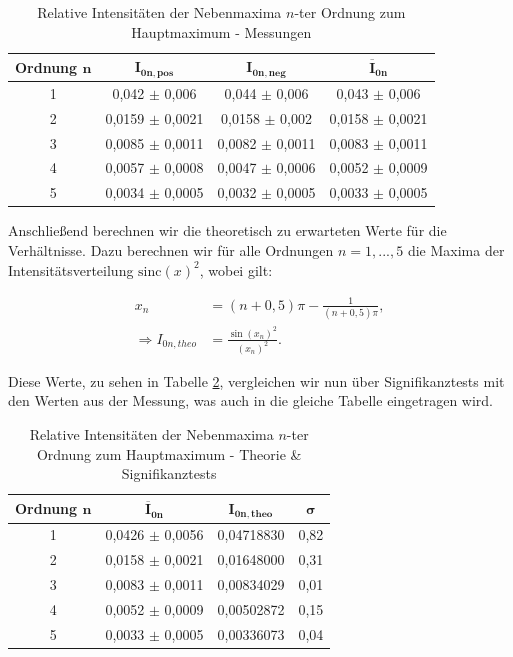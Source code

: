 \documentclass{article}
\begin{document}
\begin{table}[!hb]
    \centering
    \begin{tabular}{cccc}
        \hline
        \textbf{Ordnung} $\bm{n}$ & $\bm{I_{0n,pos}}$ & $\bm{I_{0n,neg}}$ & $\bm{\overline{I}_{0n}}$ \\ \hline
             1 &    0,042 $\pm$ 0,006 &    0,044 $\pm$ 0,006 & 0,043 $\pm$ 0,006 \\
             2 &    0,0159 $\pm$ 0,0021 &    0,0158 $\pm$ 0,002  & 0,0158 $\pm$ 0,0021 \\
             3 &    0,0085 $\pm$ 0,0011 &    0,0082 $\pm$ 0,0011 & 0,0083 $\pm$ 0,0011 \\
             4 &    0,0057 $\pm$ 0,0008 &    0,0047 $\pm$ 0,0006 & 0,0052 $\pm$ 0,0009 \\
             5 &    0,0034 $\pm$ 0,0005 &    0,0032 $\pm$ 0,0005 & 0,0033 $\pm$ 0,0005 \\ \hline
    \end{tabular}%
    \caption{Relative Intensitäten der Nebenmaxima $n$-ter Ordnung zum Hauptmaximum - Messungen}
    \label{tab:Einzelsp_RelInten_Mess}
\end{table}

Anschließend berechnen wir die theoretisch zu erwarteten Werte für die Verhältnisse. Dazu berechnen wir für alle Ordnungen $n = 1, ... , 5$ die Maxima der Intensitätsverteilung $\text{sinc}(x)^2$, wobei gilt:

\begin{equation}
    \begin{split}
        x_n &= (n + 0,5) \pi - \frac{1}{(n + 0,5) \pi}, \\
        \Rightarrow I_{0n,theo} &= \frac{\sin{(x_n)}^2}{{(x_n)}^2}.
    \end{split}
\end{equation}

Diese Werte, zu sehen in Tabelle \ref{tab:Einzelsp_RelInten_Theo&sign}, vergleichen wir nun über Signifikanztests mit den Werten aus der Messung, was auch in die gleiche Tabelle eingetragen wird. 

\begin{table}[!hb]
    \centering
    \begin{tabular}{cccc}
        \hline
        \textbf{Ordnung} $\bm{n}$ & $\bm{\overline{I}_{0n}}$ & $\bm{I_{0n,theo}}$ & $\bm{\sigma}$ \\ \hline
             1 & 0,0426 $\pm$ 0,0056 & 0,04718830 &    0,82 \\
             2 & 0,0158 $\pm$ 0,0021 & 0,01648000 &    0,31 \\
             3 & 0,0083 $\pm$ 0,0011 & 0,00834029 &    0,01 \\
             4 & 0,0052 $\pm$ 0,0009 & 0,00502872 &    0,15 \\
             5 & 0,0033 $\pm$ 0,0005 & 0,00336073 &    0,04 \\ \hline
    \end{tabular}%
    \caption{Relative Intensitäten der Nebenmaxima $n$-ter Ordnung zum Hauptmaximum - Theorie \& Signifikanztests}
    \label{tab:Einzelsp_RelInten_Theo&sign}
\end{table}
\end{document}
